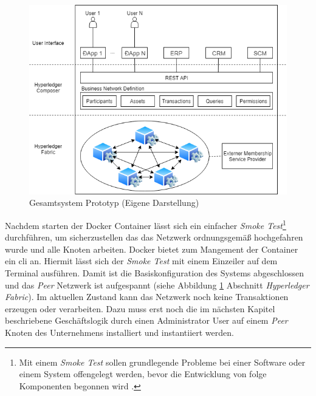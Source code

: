 \begin{figure}[H]
	\centering
	\includegraphics[width=1\linewidth]{pictures/poc-food-chain-traceability}
	\caption[Gesamtsystem Prototyp]{Gesamtsystem Prototyp (Eigene Darstellung)}
	\label{fig:poc-food-chain-traceability}
\end{figure}

Nachdem starten der Docker Container lässt sich ein einfacher \textit{Smoke Test}\footnote{Mit einem \textit{Smoke Test} sollen grundlegende Probleme bei einer Software oder einem System offengelegt werden, bevor die Entwicklung von folge Komponenten begonnen wird \citep{Everett2007}.} durchführen, um sicherzustellen das das Netzwerk ordnungsgemäß hochgefahren wurde und alle Knoten arbeiten. Docker bietet zum Mangement der Container ein \ac{cli} an. Hiermit lässt sich der \textit{Smoke Test} mit einem Einzeiler auf dem Terminal ausführen. Damit ist die Basiskonfiguration des Systems abgeschlossen und das \textit{Peer} Netzwerk ist aufgespannt (siehe Abbildung \ref{fig:poc-food-chain-traceability} Abschnitt \textit{Hyperledger Fabric}). Im aktuellen Zustand kann das Netzwerk noch keine Transaktionen erzeugen oder verarbeiten. Dazu muss erst noch die im nächsten Kapitel beschriebene Geschäftslogik durch einen Administrator User auf einem \textit{Peer} Knoten des Unternehmens installiert und instantiiert werden.

